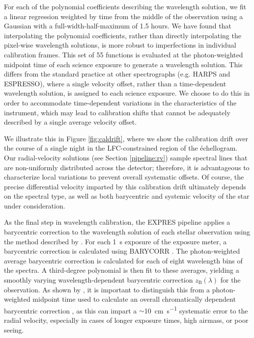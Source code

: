 For each of the polynomial coefficients describing the wavelength solution, we fit a linear regression weighted by time from the middle of the observation using a Gaussian with a full-width-half-maximum of 1.5 hours. We have found that interpolating the polynomial coefficients, rather than directly interpolating the pixel-wise wavelength solutions, is more robust to imperfections in individual calibration frames. This set of 55 functions is evaluated at the photon-weighted midpoint time of each science exposure to generate a wavelength solution. This differs from the standard practice at other spectrographs (e.g. HARPS and ESPRESSO), where a single velocity offset, rather than a time-dependent wavelength solution, is assigned to each science exposure. We choose to do this in order to accommodate time-dependent variations in the characteristics of the instrument, which may lead to calibration shifts that cannot be adequately described by a single average velocity offset.

We illustrate this in Figure \ref{fig:caldrift}, where we show the calibration drift over the course of a single night in the LFC-constrained region of the \'echellogram. Our radial-velocity solutions (see Section \ref{pipeline:rv}) sample spectral lines that are non-uniformly distributed across the detector; therefore, it is advantageous to characterize local variations to prevent overall systematic offsets. Of course, the precise differential velocity imparted by this calibration drift ultimately depends on the spectral type, as well as both barycentric and systemic velocity of the star under consideration.

As the final step in wavelength calibration, the EXPRES pipeline applies a barycentric correction to the wavelength solution of each stellar observation using the method described by \citet{blackman_accounting_2017}. For each 1~\si{\second} exposure of the exposure meter, a barycentric correction is calculated using BARYCORR \citep{wright_barycentric_2014}. The photon-weighted average barycentric correction is calculated for each of eight wavelength bins of the spectra. A third-degree polynomial is then fit to these averages, yielding a smoothly varying wavelength-dependent barycentric correction $z_\text{B}(\lambda)$ for the observation. As shown by \citet{tronsgaard_photon-weighted_2019}, it is important to distinguish this from a photon-weighted midpoint time used to calculate an overall chromatically dependent barycentric correction \citep[e.g.,][]{landoni_espresso_2014}, as this can impart a $\sim$10~\si{\centi\meter\per\second} systematic error to the radial velocity, especially in cases of longer exposure times, high airmass, or poor seeing.

